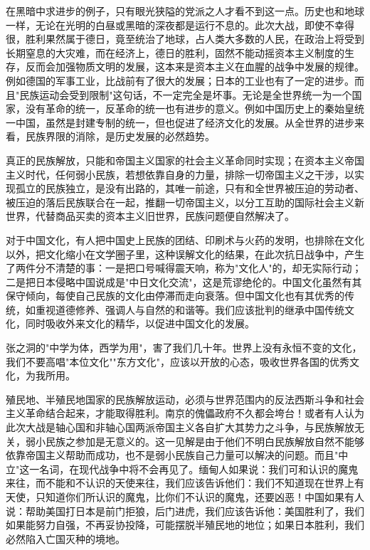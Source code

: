 \documentclass[
  openany,           %
  12pt,              %
  a4paper            %
]{ctexbook}
\begin{document}
在黑暗中求进步的例子，只有眼光狭隘的党派之人才看不到这一点。历史也和地球一样，无论在光明的白昼或黑暗的深夜都是运行不息的。此次大战，即使不幸得很，胜利果然属于德日，竟至统治了地球，占人类大多数的人民，在政治上将受到长期窒息的大灾难，而在经济上，德日的胜利，固然不能动摇资本主义制度的生存，反而会加强物质文明的发展，这本来是资本主义在血腥的战争中发展的规律。例如德国的军事工业，比战前有了很大的发展；日本的工业也有了一定的进步。而且"民族运动会受到限制"这句话，不一定完全是坏事。无论是全世界统一为一个国家，没有革命的统一，反革命的统一也有进步的意义。例如中国历史上的秦始皇统一中国，虽然是封建专制的统一，但也促进了经济文化的发展。从全世界的进步来看，民族界限的消除，是历史发展的必然趋势。

真正的民族解放，只能和帝国主义国家的社会主义革命同时实现；在资本主义帝国主义时代，任何弱小民族，若想依靠自身的力量，排除一切帝国主义之干涉，以实现孤立的民族独立，是没有出路的，其唯一前途，只有和全世界被压迫的劳动者、被压迫的落后民族联合在一起，推翻一切帝国主义，以分工互助的国际社会主义新世界，代替商品买卖的资本主义旧世界，民族问题便自然解决了。

对于中国文化，有人把中国史上民族的团结、印刷术与火药的发明，也排除在文化以外，把文化缩小在文学圈子里，这种误解文化的结果，在此次抗日战争中，产生了两件分不清楚的事：一是把口号喊得震天响，称为"文化人"的，却无实际行动；二是把日本侵略中国说成是"中日文化交流"，这是荒谬绝伦的。中国文化虽然有其保守倾向，每使自己民族的文化由停滞而走向衰落。但中国文化也有其优秀的传统，如重视道德修养、强调人与自然的和谐等。我们应该批判的继承中国传统文化，同时吸收外来文化的精华，以促进中国文化的发展。

张之洞的"中学为体，西学为用"，害了我们几十年。世界上没有永恒不变的文化，我们不要高唱"本位文化""东方文化"，应该以开放的心态，吸收世界各国的优秀文化，为我所用。

殖民地、半殖民地国家的民族解放运动，必须与世界范围内的反法西斯斗争和社会主义革命结合起来，才能取得胜利。南京的傀儡政府不久都会垮台！或者有人认为此次大战是轴心国和非轴心国两派帝国主义各自扩大其势力之斗争，与民族解放无关，弱小民族之参加是无意义的。这一见解是由于他们不明白民族解放自然不能够依靠帝国主义帮助而成功，也不是弱小民族自己力量可以解决的问题。而且"中立"这一名词，在现代战争中将不会再见了。缅甸人如果说：我们可和认识的魔鬼来往，而不能和不认识的天使来往，我们应该告诉他们：我们不知道现在世界上有天使，只知道你们所认识的魔鬼，比你们不认识的魔鬼，还要凶恶！中国如果有人说：帮助美国打日本是前门拒狼，后门进虎，我们应该告诉他：美国胜利了，我们如果能努力自强，不再妥协投降，可能摆脱半殖民地的地位；如果日本胜利，我们必然陷入亡国灭种的境地。
\end{document}
